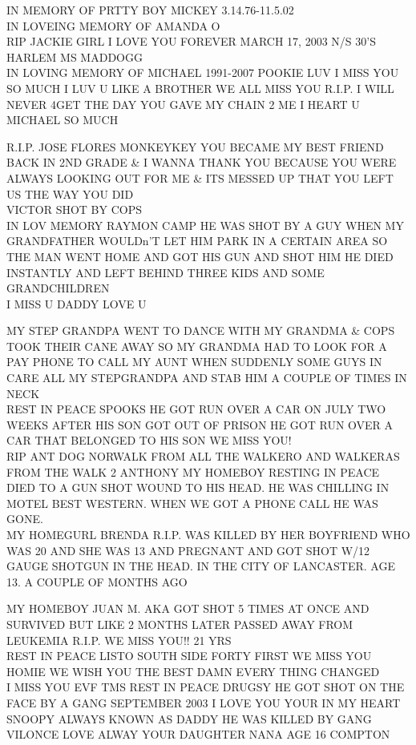 \documentclass[10pt,letterpaper]{article}
\begin{document}
IN MEMORY OF PRTTY BOY MICKEY 3.14.76{-}11.5.02\\
IN LOVEING MEMORY OF AMANDA O\\
RIP JACKIE GIRL I LOVE YOU FOREVER MARCH 17, 2003 N/S 30'S HARLEM MS MADDOGG\\
IN LOVING MEMORY OF MICHAEL 1991{-}2007 POOKIE LUV I MISS YOU SO MUCH I LUV U LIKE A BROTHER WE ALL MISS YOU R.I.P. I WILL NEVER 4GET THE DAY YOU GAVE MY CHAIN 2 ME I HEART U MICHAEL SO MUCH

R.I.P. JOSE FLORES MONKEYKEY YOU BECAME MY BEST FRIEND BACK IN 2ND GRADE \& I WANNA THANK YOU BECAUSE YOU WERE ALWAYS LOOKING OUT FOR ME \& ITS MESSED UP THAT YOU LEFT US THE WAY YOU DID\\
VICTOR SHOT BY COPS\\
IN LOV MEMORY RAYMON CAMP HE WAS SHOT BY A GUY WHEN MY GRANDFATHER WOULDn'T LET HIM PARK IN A CERTAIN AREA SO THE MAN WENT HOME AND GOT HIS GUN AND SHOT HIM HE DIED INSTANTLY AND LEFT BEHIND THREE KIDS AND SOME GRANDCHILDREN\\
I MISS U DADDY LOVE U

MY STEP GRANDPA WENT TO DANCE WITH MY GRANDMA \& COPS TOOK THEIR CANE AWAY SO MY GRANDMA HAD TO LOOK FOR A PAY PHONE TO CALL MY AUNT WHEN SUDDENLY SOME GUYS IN CARE ALL MY STEPGRANDPA AND STAB HIM A COUPLE OF TIMES IN NECK\\
REST IN PEACE SPOOKS HE GOT RUN OVER A CAR ON JULY TWO WEEKS AFTER HIS SON GOT OUT OF PRISON HE GOT RUN OVER A CAR THAT BELONGED TO HIS SON WE MISS YOU!\\
RIP ANT DOG NORWALK FROM ALL THE WALKERO AND WALKERAS FROM THE WALK  2 ANTHONY MY HOMEBOY RESTING IN PEACE DIED TO A GUN SHOT WOUND TO HIS HEAD.  HE WAS CHILLING IN MOTEL BEST WESTERN.  WHEN WE GOT A PHONE CALL HE WAS GONE.\\
MY HOMEGURL BRENDA R.I.P. WAS KILLED BY HER BOYFRIEND WHO WAS 20 AND SHE WAS 13 AND PREGNANT AND GOT SHOT W/12 GAUGE SHOTGUN IN THE HEAD.  IN THE CITY OF LANCASTER.  AGE 13.  A COUPLE OF MONTHS AGO

MY HOMEBOY JUAN M. AKA GOT SHOT 5 TIMES AT ONCE AND SURVIVED BUT LIKE 2 MONTHS LATER PASSED AWAY FROM LEUKEMIA R.I.P. WE MISS YOU!!  21 YRS\\
REST IN PEACE LISTO SOUTH SIDE FORTY FIRST WE MISS YOU HOMIE WE WISH YOU THE BEST DAMN EVERY THING CHANGED\\
I MISS YOU EVF TMS REST IN PEACE DRUGSY HE GOT SHOT ON THE FACE BY A GANG SEPTEMBER 2003 I LOVE YOU YOUR IN MY HEART\\
SNOOPY ALWAYS KNOWN AS DADDY HE WAS KILLED BY GANG VILONCE LOVE ALWAY YOUR DAUGHTER NANA AGE 16 COMPTON
\end{document}
